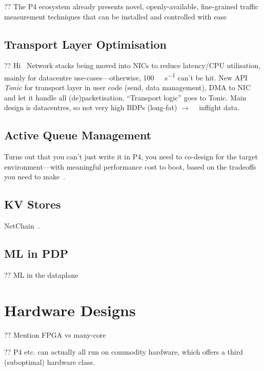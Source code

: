 ?? The P4 ecosystem already presents novel, openly-available, fine-grained traffic measurement techniques that can be installed and controlled with ease~\parencite{DBLP:conf/sigcomm/GuptaHCFRW18,DBLP:conf/sigcomm/ChenFKRR18,DBLP:conf/sosr/GhasemiBR17}

\subsection{Transport Layer Optimisation}
?? Hi~\parencite{DBLP:conf/nsdi/ArashlooLGRWW20} Network stacks being moved into NICs to reduce latency/CPU utilisation, mainly for datacentre use-cases---otherwise, \SI{100}{\giga\bit\per\second} can't be hit. New API \emph{Tonic} for transport layer in user code (send, data management), DMA to NIC and let it handle all (de)packetisation. ``Transport logic'' goes to Tonic. Main design is datacentres, so not very high BDPs (long-fat) $\rightarrow$ \si{\kilo\byte} inflight data.

\subsection{Active Queue Management}
Turns out that you can't just write it in P4, you need to co-design for the target environment---with meaningful performance cost to boot, based on the tradeoffs you need to make~\parencite{Kunze-P4-AQM}.

\subsection{KV Stores}
NetChain~\parencite{DBLP:conf/nsdi/JinLZFLSKS18}.

\subsection{ML in PDP}
?? ML in the dataplane~\parencite{DBLP:conf/hotnets/XiongZ19,DBLP:conf/sigcomm/SanvitoSB18,DBLP:journals/corr/abs-1801-05731,DBLP:journals/corr/abs-2009-02353,langlet-ml-netronome,DBLP:journals/corr/abs-2002-08987}

\section{Hardware Designs}

?? Mention FPGA vs many-core

?? P4 etc. can actually all run on commodity hardware, which offers a third (suboptimal) hardware class.

